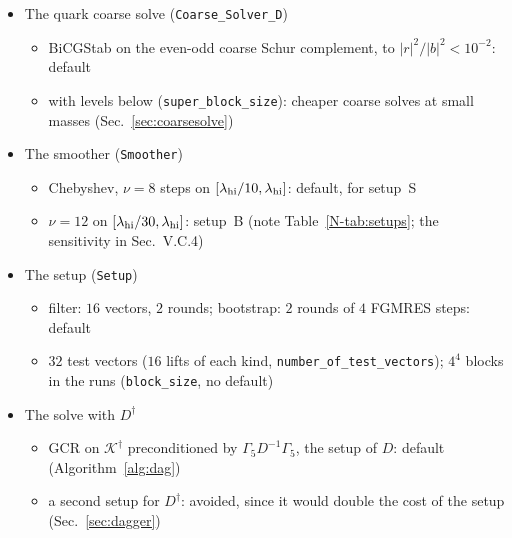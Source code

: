 \documentclass[11pt,a4paper]{article}
\numberwithin{equation}{section}
\newcommand{\dg}{^{\dagger}}
\newcommand{\Gfive}{\Gamma_5}
\newcommand{\code}[1]{\texttt{\small #1}}
\newcounter{alg}
\begin{document}
\begin{itemize}
\begin{itemize}
  \item MINRES on the $\Sigma$-Hermitian form, exact only for $c=0$ (\code{solver\_type: MINRES}): kept in the code, not compared in the note
  \end{itemize}
\item The quark coarse solve (\code{Coarse\_Solver\_D})
  \begin{itemize}
  \item BiCGStab on the even-odd coarse Schur complement, to $|r|^2/|b|^2<10^{-2}$: default
  \item with levels below (\code{super\_block\_size}): cheaper coarse solves at small masses (Sec.~\ref{sec:coarsesolve})
  \end{itemize}
\item The smoother (\code{Smoother})
  \begin{itemize}
  \item Chebyshev, $\nu=8$ steps on $[\lambda_{\rm hi}/10,\lambda_{\rm hi}]$: default, for setup~S
  \item $\nu=12$ on $[\lambda_{\rm hi}/30,\lambda_{\rm hi}]$: setup~B (note Table~\ref{N-tab:setups}; the sensitivity in Sec.~V.C.4)
  \end{itemize}
\item The setup (\code{Setup})
  \begin{itemize}
  \item filter: $16$ vectors, $2$ rounds; bootstrap: $2$ rounds of $4$ FGMRES steps: default
  \item $32$ test vectors ($16$ lifts of each kind, \code{number\_of\_test\_vectors}); $4^4$ blocks in the runs (\code{block\_size}, no default)
  \end{itemize}
\item The solve with $D\dg$
  \begin{itemize}
  \item GCR on $\mathcal K\dg$ preconditioned by $\Gfive D^{-1}\Gfive$, the setup of $D$: default (Algorithm~\ref{alg:dag})
  \item a second setup for $D\dg$: avoided, since it would double the cost of the setup (Sec.~\ref{sec:dagger})
  \end{itemize}
\end{itemize}
\end{document}
